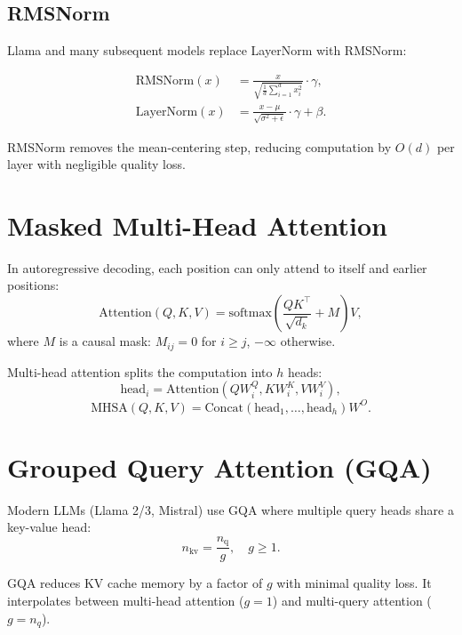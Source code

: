 \documentclass[11pt,a4paper]{book}
\theoremstyle{definition}
\begin{document}
\subsection{RMSNorm}

Llama and many subsequent models replace LayerNorm with RMSNorm:

\begin{align}
	\text{RMSNorm}(x)   & = \frac{x}{\sqrt{\frac{1}{d}\sum_{i=1}^d x_i^2}} \cdot \gamma,     \\
	\text{LayerNorm}(x) & = \frac{x - \mu}{\sqrt{\sigma^2 + \epsilon}} \cdot \gamma + \beta.
\end{align}

RMSNorm removes the mean-centering step, reducing computation by $O(d)$ per layer with negligible quality loss.

\section{Masked Multi-Head Attention}

In autoregressive decoding, each position can only attend to itself and earlier positions:
\begin{equation}
	\text{Attention}(Q, K, V) = \text{softmax}\left(\frac{QK^\top}{\sqrt{d_k}} + M\right)V,
\end{equation}
where $M$ is a causal mask: $M_{ij} = 0$ for $i \geq j$, $-\infty$ otherwise.

Multi-head attention splits the computation into $h$ heads:
\begin{equation}
	\text{head}_i = \text{Attention}(QW_i^Q, KW_i^K, VW_i^V),
\end{equation}
\begin{equation}
	\text{MHSA}(Q, K, V) = \text{Concat}(\text{head}_1, \dots, \text{head}_h) W^O.
\end{equation}

\section{Grouped Query Attention (GQA)}

Modern LLMs (Llama 2/3, Mistral) use GQA where multiple query heads share a key-value head:
\begin{equation}
	n_{\text{kv}} = \frac{n_{\text{q}}}{g}, \quad g \geq 1.
\end{equation}

GQA reduces KV cache memory by a factor of $g$ with minimal quality loss. It interpolates between multi-head attention ($g=1$) and multi-query attention ($g = n_q$).
\end{document}
